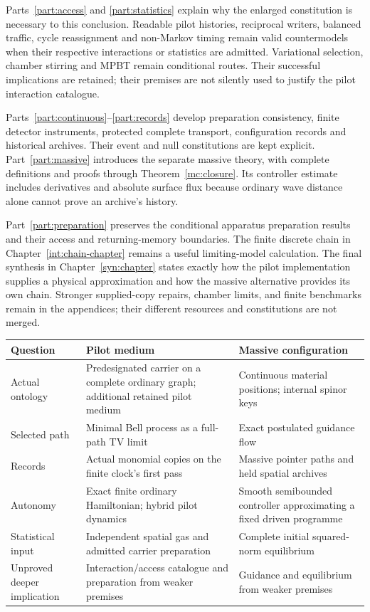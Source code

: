 \documentclass[11pt,oneside,openany]{book}
\theoremstyle{definition}
\theoremstyle{remark}\newtheorem{remark}[theorem]{Remark}
\begin{document}
Parts~\ref{part:access} and \ref{part:statistics} explain why the enlarged
constitution is necessary to this conclusion. Readable pilot histories,
reciprocal writers, balanced traffic, cycle reassignment and non-Markov
timing remain valid countermodels when their respective interactions or
statistics are admitted. Variational selection, chamber stirring and
MPBT remain conditional routes. Their successful implications are
retained; their premises are not silently used to justify the pilot
interaction catalogue.

Parts~\ref{part:continuous}--\ref{part:records} develop preparation
consistency, finite detector instruments, protected complete transport,
configuration records and historical archives. Their event and null
constitutions are kept explicit. Part~\ref{part:massive} introduces the
separate massive theory, with complete definitions and proofs through
Theorem~\ref{mc:closure}. Its controller estimate includes derivatives
and absolute surface flux because ordinary wave distance alone cannot
prove an archive's history.

Part~\ref{part:preparation} preserves the conditional apparatus
preparation results and their access and returning-memory boundaries.
The finite discrete chain in Chapter~\ref{int:chain-chapter} remains a
useful limiting-model calculation. The final synthesis in
Chapter~\ref{syn:chapter} states exactly how the pilot implementation
supplies a physical approximation and how the massive alternative
provides its own chain. Stronger supplied-copy repairs, chamber limits,
and finite benchmarks remain in the appendices; their different resources
and constitutions are not merged.

\begin{center}\small
\begin{tabularx}{\textwidth}{@{}>{\raggedright\arraybackslash}p{}XX@{}}\toprule
Question & Pilot medium & Massive configuration\\\midrule
Actual ontology & Predesignated carrier on a complete ordinary graph; additional retained pilot medium & Continuous material positions; internal spinor keys\\
Selected path & Minimal Bell process as a full-path TV limit & Exact postulated guidance flow\\
Records & Actual monomial copies on the finite clock's first pass & Massive pointer paths and held spatial archives\\
Autonomy & Exact finite ordinary Hamiltonian; hybrid pilot dynamics & Smooth semibounded controller approximating a fixed driven programme\\
Statistical input & Independent spatial gas and admitted carrier preparation & Complete initial squared-norm equilibrium\\
Unproved deeper implication & Interaction/access catalogue and preparation from weaker premises & Guidance and equilibrium from weaker premises\\\bottomrule
\end{tabularx}
\end{center}
\tableofcontents
\mainmatter
\end{document}
